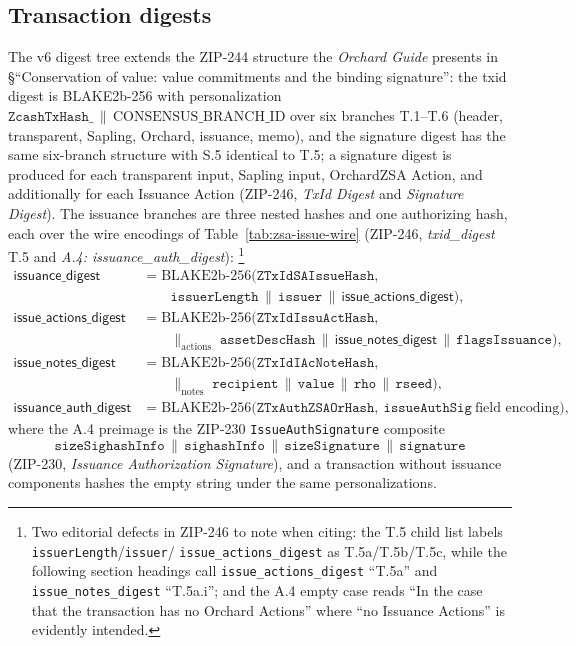 \documentclass[11pt,a4paper]{article}
\theoremstyle{definition}
\begin{document}
\subsection{Transaction digests}\label{sec:zsa-issuance-digests}

The v6 digest tree extends the ZIP-244 structure the \emph{Orchard
Guide} presents in \S``Conservation of value: value commitments and the
binding signature'': the txid digest is BLAKE2b-256 with personalization
$\texttt{ZcashTxHash\_} \,\|\, \mathrm{CONSENSUS\_BRANCH\_ID}$ over six
branches T.1--T.6 (header, transparent, Sapling, Orchard, issuance,
memo), and the signature digest has the same six-branch structure with
S.5 identical to T.5; a signature digest is produced for each transparent
input, Sapling input, OrchardZSA Action, and additionally for each
Issuance Action (ZIP-246, \emph{TxId Digest} and \emph{Signature
Digest}). The issuance branches are three nested hashes and one
authorizing hash, each over the wire encodings of
Table~\ref{tab:zsa-issue-wire}
(ZIP-246, \emph{txid\_digest} T.5 and \emph{A.4:
issuance\_auth\_digest}):%
\footnote{Two editorial defects in ZIP-246 to note when citing: the T.5
child list labels \texttt{issuerLength}/\texttt{issuer}/%
\texttt{issue\_actions\_digest} as T.5a/T.5b/T.5c, while the following
section headings call \texttt{issue\_actions\_digest} ``T.5a'' and
\texttt{issue\_notes\_digest} ``T.5a.i''; and the A.4 empty case reads
``In the case that the transaction has no Orchard Actions'' where ``no
Issuance Actions'' is evidently intended.}
\begin{align*}
\mathsf{issuance\_digest} &= \mathrm{BLAKE2b\text{-}256}\bigl(
  \texttt{ZTxIdSAIssueHash},\\
&\qquad \texttt{issuerLength} \,\|\, \texttt{issuer} \,\|\,
  \mathsf{issue\_actions\_digest}\bigr),\\
\mathsf{issue\_actions\_digest} &= \mathrm{BLAKE2b\text{-}256}\bigl(
  \texttt{ZTxIdIssuActHash},\\
&\qquad \textstyle\|_{\text{actions}}\;
  \texttt{assetDescHash} \,\|\,
  \mathsf{issue\_notes\_digest} \,\|\, \texttt{flagsIssuance}\bigr),\\
\mathsf{issue\_notes\_digest} &= \mathrm{BLAKE2b\text{-}256}\bigl(
  \texttt{ZTxIdIAcNoteHash},\\
&\qquad \textstyle\|_{\text{notes}}\;
  \texttt{recipient} \,\|\, \texttt{value} \,\|\,
  \texttt{rho} \,\|\, \texttt{rseed}\bigr),\\
\mathsf{issuance\_auth\_digest} &= \mathrm{BLAKE2b\text{-}256}\bigl(
  \texttt{ZTxAuthZSAOrHash},\
  \texttt{issueAuthSig}\ \text{field encoding}\bigr),
\end{align*}
where the A.4 preimage is the ZIP-230 \texttt{IssueAuthSignature}
composite
\[
\texttt{sizeSighashInfo} \,\|\, \texttt{sighashInfo} \,\|\,
\texttt{sizeSignature} \,\|\, \texttt{signature}
\]
(ZIP-230, \emph{Issuance Authorization Signature}), and a transaction
without issuance components hashes the empty string under the same
personalizations.
\end{document}
